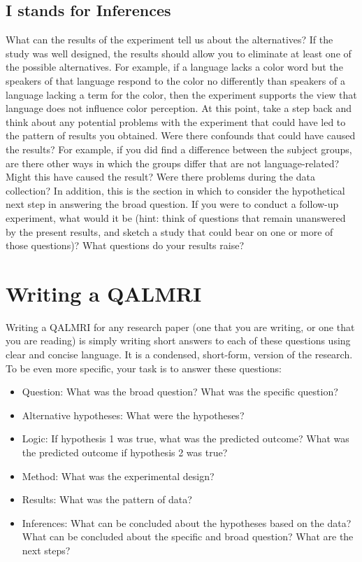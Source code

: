 \subsection{I stands for Inferences}

What can the results of the experiment tell us about the alternatives? If the study was well designed, the results should allow you to eliminate at least one of the possible alternatives. For example, if a language lacks a color word but the speakers of that language respond to the color no differently than speakers of a language lacking a term for the color, then the experiment supports the view that language does not influence color perception. At this point, take a step back and think about any potential problems with the experiment that could have led to the pattern of results you obtained. Were there confounds that could have caused the results? For example, if you did find a difference between the subject groups, are there other ways in which the groups differ that are not language-related? Might this have caused the result? Were there problems during the data collection? In addition, this is the section in which to consider the hypothetical next step in answering the broad question. If you were to conduct a follow-up experiment, what would it be (hint: think of questions that remain unanswered by the present results, and sketch a study that could bear on one or more of those questions)? What questions do your results raise? 

\section{Writing a QALMRI}

Writing a QALMRI for any research paper (one that you are writing, or one that you are reading) is simply writing short answers to each of these questions using clear and concise language. It is a condensed, short-form, version of the research. To be even more specific, your task is to answer these questions:


\begin{itemize}
\item Question: What was the broad question? What was the specific question?
\item Alternative hypotheses: What were the hypotheses?
\item Logic: If hypothesis 1 was true, what was the predicted outcome? What was the predicted outcome if hypothesis 2 was true?
\item Method: What was the experimental design?
\item Results: What was the pattern of data?
\item Inferences: What can be concluded about the hypotheses based on the data? What can be concluded about the specific and broad question? What are the next steps?
\end{itemize}

